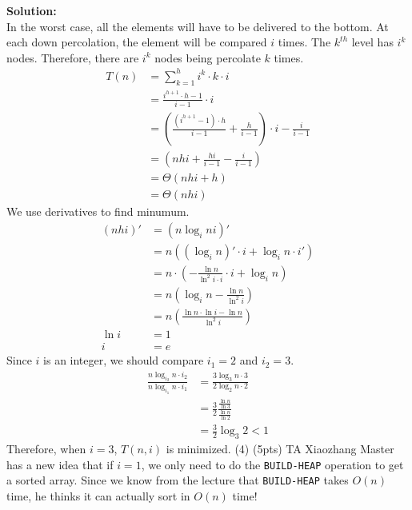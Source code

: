 \documentclass[10.5pt]{article}
\begin{document}
\textbf{Solution:}\\
In the worst case, all the elements will have to be delivered to the bottom. At each down percolation, the element will be compared $i$ times. The $k^{th}$ level has $i^k$ nodes. Therefore, there are $i^k$ nodes being percolate $k$ times.
\begin{align*}
T(n) &= \sum_{k=1}^h i^k\cdot k\cdot i\\
&= \frac{i^{h+1}\cdot h - 1}{i - 1}\cdot i\\
&=\left(\frac{(i^{h + 1} - 1)\cdot h}{i - 1} +\frac{h}{i-1}\right)\cdot i - \frac{i}{i-1}\\
&=\left(nhi + \frac{hi}{i - 1} - \frac{i}{i-1}\right)\\
&=\Theta\left(nhi + h\right)\\
&=\Theta\left(nhi\right)
\end{align*}
We use derivatives to find minumum.
\begin{align*}
    (nhi)' &= (n\log_i n i)'\\
    &=n\left((\log_in)'\cdot i + \log_i n \cdot i'\right)\\
    &=n\cdot\left(-\frac{\ln n}{\ln^2 i \cdot i}\cdot i + \log_i n\right)\\
    &=n\left(\log_i n - \frac{\ln n}{\ln^2 i}\right)\\
    &=n\left(\frac{\ln n \cdot \ln i - \ln n}{\ln^2 i}\right)\\
    \ln i &= 1\\
    i &= e
\end{align*}
Since $i$ is an integer, we should compare $i_1 = 2$ and $i_2 = 3$.
\begin{align*}
    \frac{n\log_{i_2}n\cdot i_2}{n\log_{i_1}n\cdot i_1} &=\frac{3\log_3 n\cdot 3}{2\log_2 n\cdot 2}\\
    &=\frac{3}{2}\frac{\frac{\ln n}{\ln 3}}{\frac{\ln n}{\ln 2}}\\
    &=\frac32\log_3 2 < 1
\end{align*}
Therefore, when $i = 3$, $T(n, i)$ is minimized.
\newpage
(4) (5pts) TA Xiaozhang Master has a new idea that if $i = 1$, we only need to do the \texttt{BUILD-HEAP} operation to get a sorted array. Since we know from the lecture that \texttt{BUILD-HEAP} takes $O(n)$ time, he thinks it can actually sort in $O(n)$ time! \\
\end{document}
